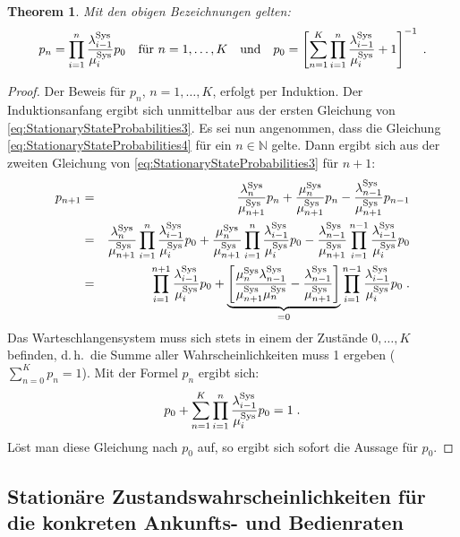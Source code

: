 \documentclass[a4paper,11pt,oneside]{article}
\newtheorem{theorem}{Theorem}
\theoremstyle{definition}
\begin{document}
\begin{theorem}
Mit den obigen Bezeichnungen gelten:
\begin{equation}
p_n=\prod_{i=1}^n\frac{\lambda_{i-1}^{\rm Sys}}{\mu_i^{\rm Sys}}p_0 ~~~\textrm{für}~ n=1,\ldots,K
~~~\textrm{und}~~~
p_0=\left[\sum_{n=1}^K\prod_{i=1}^n\frac{\lambda_{i-1}^{\rm Sys}}{\mu_i^{\rm Sys}}+1\right]^{-1}\;.
\label{eq:StationaryStateProbabilities4}
\end{equation}
\end{theorem}

\begin{proof}
Der Beweis für $p_n$, $n=1,\ldots,K$, erfolgt per Induktion. Der Induktionsanfang ergibt sich unmittelbar aus der ersten Gleichung von \eqref{eq:StationaryStateProbabilities3}. Es sei nun angenommen, dass die Gleichung \eqref{eq:StationaryStateProbabilities4} für ein $n\in\mathbb{N}$ gelte. Dann ergibt sich aus der zweiten Gleichung von \eqref{eq:StationaryStateProbabilities3} für $n+1$:
\begin{eqnarray*}
p_{n+1}&=&
\frac{\lambda_n^{\rm Sys}}{\mu_{n+1}^{\rm Sys}}p_n+\frac{\mu_n^{\rm Sys}}{\mu_{n+1}^{\rm Sys}}p_n-\frac{\lambda_{n-1}^{\rm Sys}}{\mu_{n+1}^{\rm Sys}}p_{n-1}\\&=&
\frac{\lambda_n^{\rm Sys}}{\mu_{n+1}^{\rm Sys}}\prod_{i=1}^n\frac{\lambda_{i-1}^{\rm Sys}}{\mu_i^{\rm Sys}}p_0+
\frac{\mu_n^{\rm Sys}}{\mu_{n+1}^{\rm Sys}}\prod_{i=1}^n\frac{\lambda_{i-1}^{\rm Sys}}{\mu_i^{\rm Sys}}p_0-
\frac{\lambda_{n-1}^{\rm Sys}}{\mu_{n+1}^{\rm Sys}}\prod_{i=1}^{n-1}\frac{\lambda_{i-1}^{\rm Sys}}{\mu_i^{\rm Sys}}p_0\\&=&
\prod_{i=1}^{n+1}\frac{\lambda_{i-1}^{\rm Sys}}{\mu_i^{\rm Sys}}p_0+
\underbrace{\left[\frac{\mu_n^{\rm Sys}\lambda_{n-1}^{\rm Sys}}{\mu_{n+1}^{\rm Sys}\mu_n^{\rm Sys}}-\frac{\lambda_{n-1}^{\rm Sys}}{\mu_{n+1}^{\rm Sys}}\right]}_{=0}
\prod_{i=1}^{n-1}\frac{\lambda_{i-1}^{\rm Sys}}{\mu_i^{\rm Sys}}p_0\;.
\end{eqnarray*}
Das Warteschlangensystem muss sich stets in einem der Zustände $0,\ldots,K$ befinden, d.\,h.\ die Summe aller Wahrscheinlichkeiten muss 1 ergeben ($\sum_{n=0}^Kp_n=1$). Mit der Formel $p_n$ ergibt sich:
$$
p_0+\sum_{n=1}^K\prod_{i=1}^n\frac{\lambda_{i-1}^{\rm Sys}}{\mu_i^{\rm Sys}}p_0=1\;.
$$
Löst man diese Gleichung nach $p_0$ auf, so ergibt sich sofort die Aussage für $p_0$.
\end{proof}

\subsection{Stationäre Zustandswahrscheinlichkeiten für die konkreten Ankunfts- und Bedienraten}
\end{document}
